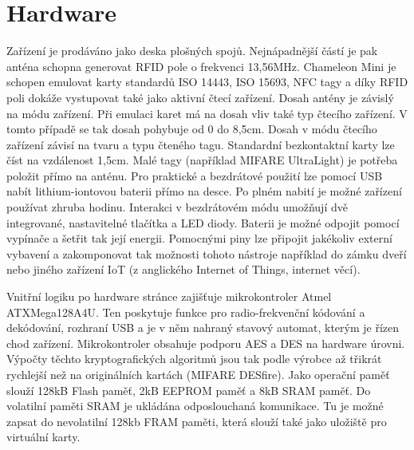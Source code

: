 \section{Hardware}
Zařízení je prodáváno jako deska plošných spojů. Nejnápadnější částí je pak anténa schopna generovat RFID pole o frekvenci 13,56MHz. Chameleon Mini je schopen emulovat karty standardů ISO 14443, ISO 15693, NFC tagy a díky RFID poli dokáže vystupovat také jako aktivní čtecí zařízení.\cite{ChameleonKickStarter} Dosah antény je závislý na módu zařízení. Při emulaci karet má na dosah vliv také typ čtecího zařízení. V tomto případě se tak dosah pohybuje od 0 do 8,5cm. Dosah v módu čtecího zařízení závisí na tvaru a typu čteného tagu. Standardní bezkontaktní karty lze číst na vzdálenost 1,5cm. Malé tagy (například MIFARE UltraLight) je potřeba položit přímo na anténu.\cite{ChameleonEshop} Pro praktické a bezdrátové použití lze pomocí USB nabít {lithium-iontovou} baterii přímo na desce. Po plném nabití je možné zařízení používat zhruba hodinu. Interakci v bezdrátovém módu umožňují dvě integrované, nastavitelné tlačítka a LED diody. Baterii je možné odpojit pomocí vypínače a šetřit tak její energii. Pomocnými piny lze připojit jakékoliv externí vybavení a zakomponovat tak možnosti tohoto nástroje například do zámku dveří nebo jiného zařízení IoT (z anglického Internet of Things, internet věcí).\cite{ChameleonKickStarter}
\par
Vnitřní logiku po hardware stránce zajišťuje mikrokontroler Atmel ATXMega128A4U. Ten poskytuje funkce pro {radio-frekvenční} kódování a dekódování, rozhraní USB a je v něm nahraný stavový automat, kterým je řízen chod zařízení. Mikrokontroler obsahuje podporu AES a DES na hardware úrovni. Výpočty těchto kryptografických algoritmů jsou tak podle výrobce až třikrát rychlejší než na originálních kartách (MIFARE DESfire). Jako operační paměť slouží 128kB Flash paměť, 2kB EEPROM paměť a 8kB SRAM paměť. Do volatilní paměti SRAM je ukládána odposlouchaná komunikace. Tu je možné zapsat do nevolatilní 128kb FRAM paměti, která slouží také jako uložiště pro virtuální karty.\cite{ChameleonKickStarter}

